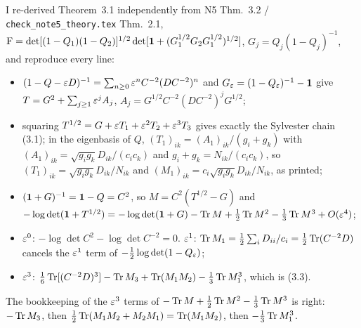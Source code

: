 \documentclass[11pt]{article}
\begin{document}
I re-derived Theorem~3.1 independently from N5 Thm.~3.2 /
\texttt{check\_note5\_theory.tex} Thm.~2.1,
$\operatorname{F}=\det[(1-Q_1)(1-Q_2)]^{1/2}\det[\mathbf 1+(G_1^{1/2}G_2G_1^{1/2})^{1/2}]$,
$G_j=Q_j(1-Q_j)^{-1}$, and reproduce every line:
\begin{itemize}\itemsep1pt
\item $(1-Q-\varepsilon D)^{-1}=\sum_{n\ge0}\varepsilon^nC^{-2}(DC^{-2})^n$ and $G_\varepsilon=(1-Q_\varepsilon)^{-1}-\mathbf 1$ give
 $T=G^2+\sum_{j\ge1}\varepsilon^jA_j$, $A_j=G^{1/2}C^{-2}(DC^{-2})^jG^{1/2}$;
\item squaring $T^{1/2}=G+\varepsilon T_1+\varepsilon^2T_2+\varepsilon^3T_3$ gives exactly the Sylvester chain (3.1);
 in the eigenbasis of $Q$, $(T_1)_{ik}=(A_1)_{ik}/(g_i+g_k)$ with
 $(A_1)_{ik}=\sqrt{g_ig_k}D_{ik}/(c_ic_k)$ and $g_i+g_k=N_{ik}/(c_ic_k)$, so
 $(T_1)_{ik}=\sqrt{g_ig_k}D_{ik}/N_{ik}$ and $(M_1)_{ik}=c_i\sqrt{g_ig_k}D_{ik}/N_{ik}$, as printed;
\item $(\mathbf 1+G)^{-1}=\mathbf 1-Q=C^2$, so $M=C^2(T^{1/2}-G)$ and
 $-\log\det(\mathbf 1+T^{1/2})=-\log\det(\mathbf 1+G)-\operatorname{Tr} M+\frac12\operatorname{Tr} M^2-\frac13\operatorname{Tr} M^3+O(\varepsilon^4)$;
\item $\varepsilon^0$: $-\log\det C^2-\log\det C^{-2}=0$.  $\varepsilon^1$:
 $\operatorname{Tr} M_1=\frac12\sum_iD_{ii}/c_i=\frac12\operatorname{Tr}(C^{-2}D)$ cancels the $\varepsilon^1$ term of
 $-\frac12\log\det(1-Q_\varepsilon)$;
\item $\varepsilon^3$: $\frac16\operatorname{Tr}[(C^{-2}D)^3]-\operatorname{Tr} M_3+\operatorname{Tr}(M_1M_2)-\frac13\operatorname{Tr} M_1^3$, which is (3.3).
\end{itemize}
The bookkeeping of the $\varepsilon^3$ terms of $-\operatorname{Tr} M+\frac12\operatorname{Tr} M^2-\frac13\operatorname{Tr} M^3$ is right:
$-\operatorname{Tr} M_3$, then $\frac12\operatorname{Tr}(M_1M_2+M_2M_1)=\operatorname{Tr}(M_1M_2)$, then $-\frac13\operatorname{Tr} M_1^3$.
\end{document}
